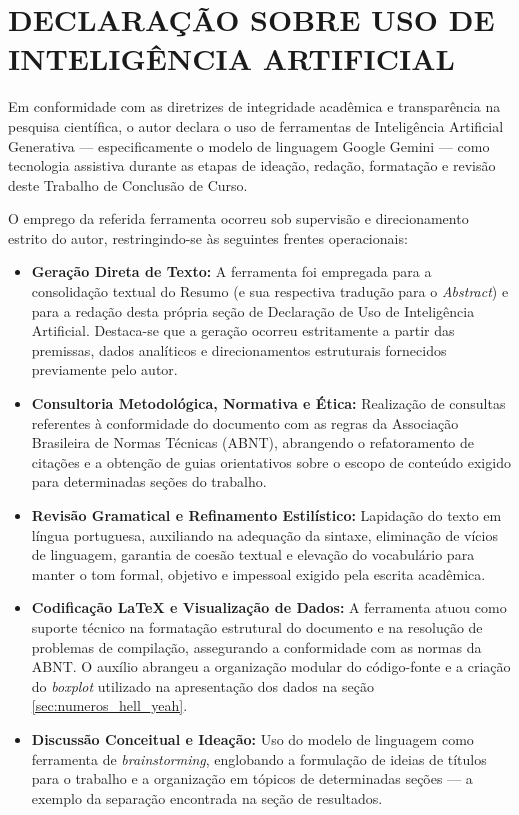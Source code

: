 \section{DECLARAÇÃO SOBRE USO DE INTELIGÊNCIA ARTIFICIAL }

Em conformidade com as diretrizes de integridade acadêmica e transparência na pesquisa científica, o autor declara o uso de ferramentas de Inteligência Artificial Generativa — especificamente o modelo de linguagem Google Gemini — como tecnologia assistiva durante as etapas de ideação, redação, formatação e revisão deste Trabalho de Conclusão de Curso.

O emprego da referida ferramenta ocorreu sob supervisão e direcionamento estrito do autor, restringindo-se às seguintes frentes operacionais:
\begin{itemize}
    \item \textbf{Geração Direta de Texto:} A ferramenta foi empregada para a consolidação textual do Resumo (e sua respectiva tradução para o \textit{Abstract}) e para a redação desta própria seção de Declaração de Uso de Inteligência Artificial. Destaca-se que a geração ocorreu estritamente a partir das premissas, dados analíticos e direcionamentos estruturais fornecidos previamente pelo autor.

    \item \textbf{Consultoria Metodológica, Normativa e Ética:} Realização de consultas referentes à conformidade do documento com as regras da Associação Brasileira de Normas Técnicas (ABNT), abrangendo o refatoramento de citações e a obtenção de guias orientativos sobre o escopo de conteúdo exigido para determinadas seções do trabalho.

    \item \textbf{Revisão Gramatical e Refinamento Estilístico:} Lapidação do texto em língua portuguesa, auxiliando na adequação da sintaxe, eliminação de vícios de linguagem, garantia de coesão textual e elevação do vocabulário para manter o tom formal, objetivo e impessoal exigido pela escrita acadêmica.

    \item \textbf{Codificação LaTeX e Visualização de Dados:} A ferramenta atuou como suporte técnico na formatação estrutural do documento e na resolução de problemas de compilação, assegurando a conformidade com as normas da ABNT. O auxílio abrangeu a organização modular do código-fonte e a criação do \textit{boxplot} utilizado na apresentação dos dados na seção \ref{sec:numeros_hell_yeah}.

    \item \textbf{Discussão Conceitual e Ideação:} Uso do modelo de linguagem como ferramenta de \textit{brainstorming}, englobando a formulação de ideias de títulos para o trabalho e a organização em tópicos de determinadas seções --- a exemplo da separação encontrada na seção de resultados.
\end{itemize}
    
